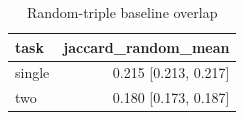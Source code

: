 \begin{table}[t]
\centering
\small
\begin{tabular}{lr}
\toprule
task & jaccard\_random\_mean \\
\midrule
single & 0.215 [0.213, 0.217] \\
two & 0.180 [0.173, 0.187] \\
\bottomrule
\end{tabular}
\caption{Random-triple baseline overlap}
\label{tab:addition_kc_random}
\end{table}